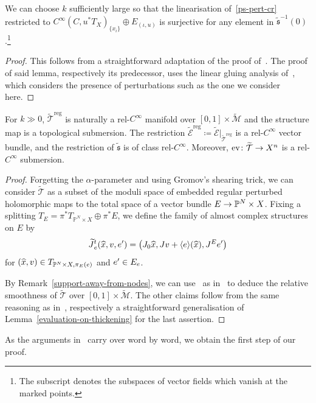 \documentclass[AHL,Unicode,longabstracts]{cedram}
\newcommand{\inv}{^{-1}}
\newcommand{\lspan}[1]{\langle {#1}\rangle}
\newcommand{\cl}{\colon}
\newcommand{\bP}{\mathbb{P}}
\newcommand{\cE}{\mathcal{E}}
\newcommand{\cM}{\mathcal{M}}
\newcommand{\cT}{\mathcal{T}}
\newcommand{\fs}{\mathfrak{s}}
\DeclareMathOperator{\reg}{reg}
\DeclareMathOperator{\eva}{ev}
\renewcommand*{\to}{\mathchoice{\longrightarrow}{\rightarrow}{\rightarrow}{\rightarrow}}
\let\oldin\in
\renewcommand{\in}{\mathchoice{\oldin}{\oldin}{\,\oldin\,}{\,\oldin\,}}
\let\oldtilde\tilde
\renewcommand*{\tilde}[1]{\mathchoice{\widetilde{#1}}{\widetilde{#1}}{\oldtilde{#1}}{\oldtilde{#1}}}
\let\oldhat\hat
\renewcommand*{\hat}[1]{\mathchoice{\widehat{#1}}{\widehat{#1}}{\oldhat{#1}}{\oldhat{#1}}}
\begin{document}
\begin{lemm}
We can choose $k$ sufficiently large so that the linearisation of~\eqref{ps-pert-cr} restricted to $C^\infty(C,u^*T_X)_{\{x_i\}} \oplus E_{(\iota,u)}$ is surjective for any element in $\widetilde{\fs}\inv(0)$.\footnote{ The subscript denotes the subspaces of vector fields which vanish at the marked points.}
\end{lemm}

\begin{proof}
This follows from a straightforward adaptation of the proof of~\cite[Lemma~4.19]{HS22}. The proof of said lemma, respectively its predecessor, uses the linear gluing analysis of~\cite[Appendix~B]{P16}, which considers the presence of perturbations such as the one we consider here.
\end{proof}

\begin{prop}
For $k\gg 0$, $\widetilde{\cT}^{\text{reg}}$ is naturally a rel-$C^\infty$ manifold over $[0,1]\times \widetilde{\cM}$ and the structure map is a topological submersion. The restriction $\widetilde{\cE}^{\reg} \coloneqq \widetilde{\cE}|_{\widetilde{\cT}^{\reg}}$ is a rel-$C^\infty$ vector bundle, and the restriction of $\widetilde{\fs}$ is of class rel-$C^\infty$. Moreover, $\eva \cl \widetilde{\cT}\to X^n$ is a rel-$C^\infty$ submersion.
\end{prop}

\begin{proof}
Forgetting the $\alpha$-parameter and using Gromov's shearing trick, we can consider $\widetilde{\cT}$ as a subset of the moduli space of embedded regular perturbed holomorphic maps to the total space of a vector bundle $E\to \bP^N\times X$. Fixing a splitting $T_E = \pi^*T_{\bP^N\times X}\oplus \pi^*E$, we define the family of almost complex structures on $E$ by
\[
\tilde{J}^t_{e}(\hat{x},v,e') = \left(J_0\hat{x}, Jv + \lspan{e}(\hat{x}),J^E e'\right)
\]
for $(\hat{x},v)\in T_{\bP^N\times X,\pi_E(e)}$ and $e'\in E_e$.

By Remark~\ref{support-away-from-nodes}, we can use~\cite{Swa21} as in~\cite[Proposition~5.4]{HS22} to deduce the relative smoothness of $\widetilde{\cT}$ over $[0,1]\times \widetilde{\cM}$. The other claims follow from the same reasoning as in~\cite[Section~5]{HS22}, respectively a straightforward generalisation of Lemma~\ref{evaluation-on-thickening} for the last assertion.
\end{proof}

As the arguments in~\cite[Section~5]{HS22} carry over word by word, we obtain the first step of our proof.
\end{document}
